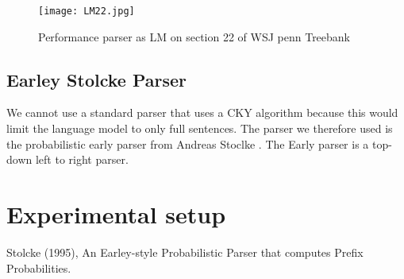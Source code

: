 \documentclass[11pt,a4paper]{article}
\begin{document}
\begin{figure}
  \centering   
  \texttt{[image: LM22.jpg]}
  \caption{Performance parser as LM on section 22 of WSJ penn Treebank}
 \label{fig:22}
\end{figure}

\subsection{Earley Stolcke Parser}
We cannot use a standard parser that uses a CKY algorithm because this would limit the language model to only full sentences. The parser we therefore used is the probabilistic early parser from Andreas Stoclke \cite{stolcke}. The Early parser is a top-down left to right parser.

\section{Experimental setup}

\begin{thebibliography}{2}
Stolcke (1995), An Earley-style Probabilistic Parser that computes Prefix Probabilities.
\end{thebibliography}
\end{document}
